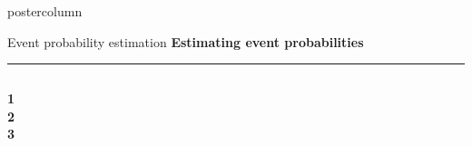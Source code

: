\documentclass[final,hyperref={pdfpagelabels=false}]{beamer}
\newcommand{\bfBlue}[1]{\textcolor{koaladarkestblue}{\textbf{#1}}}
\begin{document}
\begin{frame}
\begin{columns}
\begin{column}{1\textwidth}
\begin{columns}[T]
\begin{column}{.484\textwidth}
\begin{beamercolorbox}[center,wd=\textwidth]{postercolumn}
\begin{minipage}[T]{.95\textwidth}
\begin{block}{\footnotesize Event probability estimation}
\bfBlue{Estimating event probabilities}
\\[0.05cm]
\textcolor{LMUlightgray}{\hrule{}}
\vspace{1ex}
\hspace*{-40px}
\begin{minipage}{\textwidth}
\begin{columns}[t]
  \begin{column}{.01\textwidth}
  \vspace{7px}
  \begin{minipage}{\textwidth}
  \bfBlue{1} \\
  \vspace{46px}
  \bfBlue{2} \\
  \vspace{14px}
  \bfBlue{3}
  \end{minipage}
  \end{column}

  \hspace{-30px}
  \textcolor{LMUlightgray}{\vrule{}}
  \hspace{0px}


\end{columns}
\end{minipage}
\end{block}
\end{minipage}
\end{beamercolorbox}
\end{column}
\end{columns}
\end{column}
\end{columns}
\end{frame}
\end{document}
